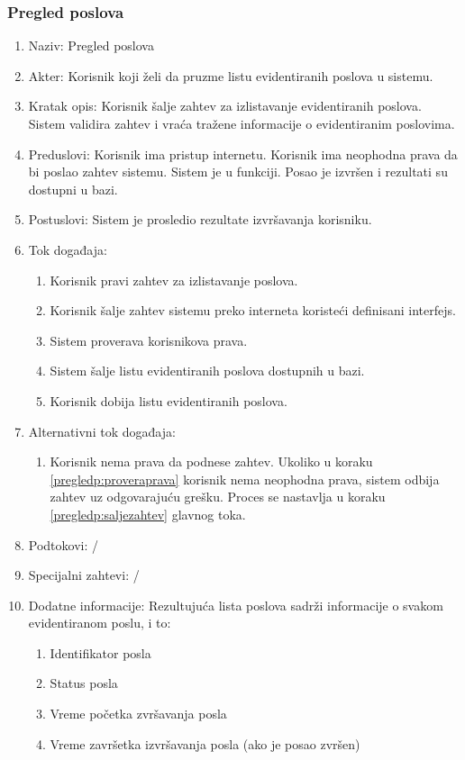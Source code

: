 \documentclass[12pt,oneside]{memoir}
\begin{document}
\subsubsection{Pregled poslova}
\begin{enumerate}
\item Naziv: Pregled poslova
\item Akter: Korisnik koji želi da pruzme listu evidentiranih poslova u sistemu.
\item Kratak opis: Korisnik šalje zahtev za izlistavanje evidentiranih poslova. Sistem validira zahtev i vraća tražene informacije o evidentiranim poslovima.
\item Preduslovi: Korisnik ima pristup internetu. Korisnik ima neophodna prava da bi poslao zahtev sistemu. Sistem je u funkciji. Posao je izvršen i rezultati su dostupni u bazi.
\item Postuslovi: Sistem je prosledio rezultate izvršavanja korisniku.
\item Tok događaja:
	\begin{enumerate}
	\item \label{pregledp:konstruisezahtev} Korisnik pravi zahtev za izlistavanje poslova.
	\item \label{pregledp:saljezahtev} Korisnik šalje zahtev sistemu preko interneta koristeći definisani interfejs.
	\item \label{pregledp:proveraprava} Sistem proverava korisnikova prava.
	\item \label{pregledp:slanjeliste} Sistem šalje listu evidentiranih poslova dostupnih u bazi.
	\item Korisnik dobija listu evidentiranih poslova.
	\end{enumerate}
\item Alternativni tok događaja:
	\begin{enumerate}
	\item Korisnik nema prava da podnese zahtev. Ukoliko u koraku \ref{pregledp:proveraprava} korisnik nema neophodna prava, sistem odbija zahtev uz odgovarajuću grešku. Proces se nastavlja u koraku \ref{pregledp:saljezahtev} glavnog toka.
	\end{enumerate}
\item Podtokovi: /
\item Specijalni zahtevi: /
\item Dodatne informacije: Rezultujuća lista poslova sadrži informacije o svakom evidentiranom poslu, i to:
	\begin{enumerate}
	\item Identifikator posla
	\item Status posla
	\item Vreme početka zvršavanja posla
	\item Vreme završetka izvršavanja posla (ako je posao zvršen)
	\end{enumerate}
\end{enumerate}
\end{document}
